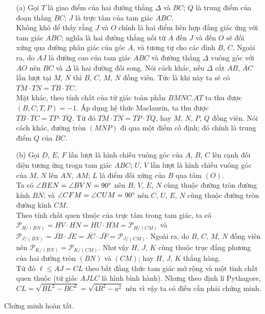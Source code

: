         \begin{solution}
            \hfill
            \begin{enumerate}
                \item[(a)] Gọi \(T\) là giao điểm của hai đường thẳng \(\Delta\) và \(BC\); \(Q\) là trung điểm của đoạn thẳng \(BC\); \(J\) là trực tâm của tam giác \(ABC\).\\
                Không khó để thấy rằng \(J\) và \(O\) chính là hai điểm liên hợp đẳng giác ứng với tam giác \(ABC\); nghĩa là hai đường thẳng nối từ \(A\) đến \(J\) và đến \(O\) sẽ đối xứng qua đường phân giác của góc \(A\), và tương tự cho các đỉnh \(B\), \(C\). Ngoài ra, do \(AJ\) là đường cao của tam giác \(ABC\) và đường thẳng \(\Delta\) vuông góc với \(AO\) nên \(BC\) và \(\Delta\) là hai đường đối song. Nói cách khác, nếu \(\Delta\) cắt \(AB\), \(AC\) lần lượt tại \(M\), \(N\) thì \(B\), \(C\), \(M\), \(N\) đồng viên. Tức là khi này ta sẽ có \(\overline{TM} \cdot \overline{TN} = \overline{TB} \cdot \overline{TC}\).\\
                Mặt khác, theo tính chất của tứ giác toàn phần \(BMNC.AT\) ta thu được \((B,C;T,P) = -1\). Áp dụng hệ thức Maclaurin, ta thu được \(\overline{TB} \cdot \overline{TC} = \overline{TP} \cdot \overline{TQ}\). Từ đó \(\overline{TM} \cdot \overline{TN} = \overline{TP} \cdot \overline{TQ}\), hay \(M\), \(N\), \(P\), \(Q\) đồng viên. Nói cách khác, đường tròn \((MNP)\) đi qua một điểm cố định; đó chính là trung điểm \(Q\) của \(BC\).
                \item[(b)] Gọi \(D\), \(E\), \(F\) lần lượt là hình chiếu vuông góc của \(A\), \(B\), \(C\) lên cạnh đối diện tương ứng trogn tam giác \(ABC\); \(U\), \(V\) lần lượt là hình chiếu vuông góc của \(M\), \(N\) lên \(AN\), \(AM\); \(L\) là điểm đối xứng của \(B\) qua tâm \((O)\).\\
                Ta có \(\angle BEN = \angle BVN = 90 \degree\) nên \(B\), \(V\), \(E\), \(N\) cùng thuộc đường tròn đường kính \(BN\); và \(\angle CFM = \angle CUM = 90 \degree\) nên \(C\), \(U\), \(E\), \(N\) cùng thuộc đường tròn đường kính \(CM\).\\
                Theo tính chất quen thuộc của trực tâm trong tam giác, ta có \(\mathcal{P}_{H/(BN)} = \overline{HV} \cdot \overline{HN} = \overline{HU} \cdot \overline{HM} = \mathcal{P}_{H/(CM)}\) và \(\mathcal{P}_{J/(BN)} = \overline{JB} \cdot \overline{JE} = \overline{JC} \cdot \overline{JF} = \mathcal{P}_{J/(CM)}\). Ngoài ra, do \(B\), \(C\), \(M\), \(N\) đồng viên nên \(\mathcal{P}_{K/(BN)} = \mathcal{P}_{K/(CM)}\). Như vậy \(H\), \(J\), \(K\) cùng thuộc trục đẳng phương của hai đường tròn \((BN)\) và \((CM)\); hay \(H\), \(J\), \(K\) thẳng hàng.\\
                Từ đó \(\ell \leq AJ = CL\) theo bất đẳng thức tam giác mở rộng và một tính chất quen thuộc (tứ giác \(AJLC\) là hình bình hành). Nhưng theo định lí Pythagore, \(CL = \sqrt{BL^2 - BC^2} = \sqrt{4R^2 - a^2}\) nên vì vậy ta có điều cần phải chứng minh.
            \end{enumerate}
            Chứng minh hoàn tất.
        \end{solution}

